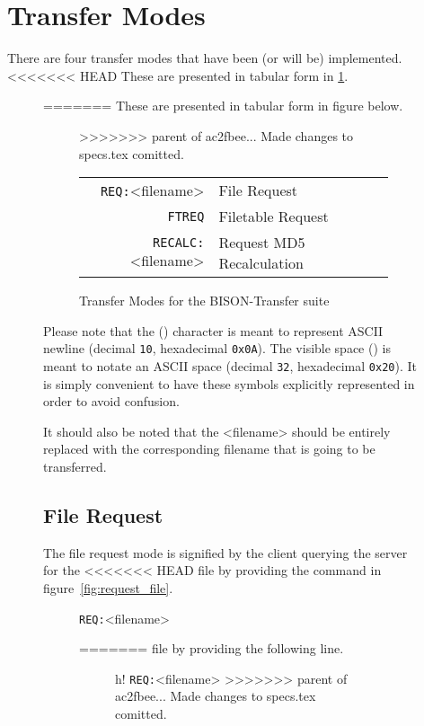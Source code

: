 \documentclass[12pt]{article}
\begin{document}
\section{Transfer Modes}
\label{sec:transfer_modes}
There are four transfer modes that have been (or will be) implemented.
<<<<<<< HEAD
These are presented in tabular form in \ref{fig:transfer_modes}.
\begin{figure}[H]
=======
These are presented in tabular form in figure below.
\begin{figure}[h!]
>>>>>>> parent of ac2fbee... Made changes to specs.tex comitted.
	\centering
	\begin{tabular}{r l}
		\verb+REQ:+\textvisiblespace <filename>\carriagereturn\carriagereturn
		& File Request\\
		\verb+FTREQ+\carriagereturn\carriagereturn & Filetable Request \\
		\verb+RECALC:+\textvisiblespace <filename>\carriagereturn
		\carriagereturn & Request MD5 Recalculation
	\end{tabular}
	\caption{Transfer Modes for the BISON-Transfer suite}
	\label{fig:transfer_modes}
\end{figure}

Please note that the (\carriagereturn) character is meant to represent ASCII
newline (decimal \verb+10+, hexadecimal \verb+0x0A+).  The
visible space (\textvisiblespace) is meant to notate an ASCII space (decimal
\verb+32+, hexadecimal \verb+0x20+).
It is simply convenient to have these symbols explicitly represented in order
to avoid confusion.

It should also be noted that the <filename> should be entirely replaced with
the corresponding filename that is going to be transferred.

\subsection{File Request}
\label{sec:request_file}
The file request mode is signified by the client querying the server for the
<<<<<<< HEAD
file by providing the command in figure~\ref{fig:request_file}.
\begin{figure}[H]
	\centering
	\verb+REQ:+\textvisiblespace <filename>\carriagereturn\carriagereturn
	\caption{Request File Mode}
	\label{fig:request_file}
=======
file by providing the following line.

\begin{figure}{h!}
	\centering
	\verb+REQ:+\textvisiblespace <filename>\carriagereturn\carriagereturn
	\label{Request File Mode}
>>>>>>> parent of ac2fbee... Made changes to specs.tex comitted.
\end{figure}


\end{figure}
\end{figure}
\end{document}
